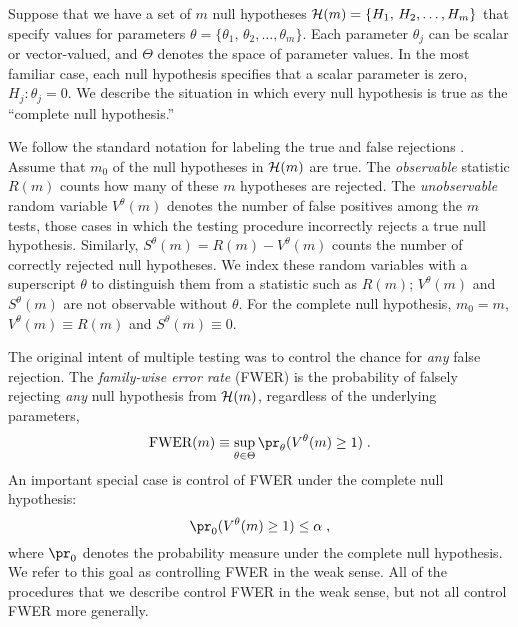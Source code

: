 \documentclass[12pt]{article}
\begin{document}
Suppose that we have a set of $m$ null hypotheses ${\cal H}(m) =
\{H_1, \, H_2, \ldots, H_m\}$ that specify values for parameters
$\theta = \{\theta_1,\,\theta_2, \ldots, \theta_m \}$.  Each parameter
$\theta_j$ can be scalar or vector-valued, and $\Theta$ denotes the
space of parameter values.  In the most familiar case, each null
hypothesis specifies that a scalar parameter is zero, $H_j: \theta_j =
0$.  We describe the situation in which every null hypothesis is true
as the ``complete null hypothesis.''

We follow the standard notation for labeling the true and false
rejections \citet{benjamini95}.  Assume that $m_0$ of the null
hypotheses in ${\cal H}(m)$ are true.  The {\em observable} statistic
$R(m)$ counts how many of these $m$ hypotheses are rejected.  The {\em
  unobservable} random variable $V^\theta(m)$ denotes the number of
false positives among the $m$ tests, those cases in which the testing
procedure incorrectly rejects a true null hypothesis.  Similarly,
$S^{\theta}(m) = R(m)-V^\theta(m)$ counts the number of correctly
rejected null hypotheses.  We index these random variables with a
superscript $\theta$ to distinguish them from a statistic such as
$R(m)$; $V^\theta(m)$ and $S^\theta(m)$ are not observable without
$\theta$.  For the complete null hypothesis, $m_0 = m$, $V^\theta(m)
\equiv R(m)$ and $S^{\theta}(m) \equiv 0$.

The original intent of multiple testing was to control the chance for {\em
any} false rejection.  The {\em family-wise error rate} (FWER) is the
probability of falsely rejecting {\em any} null hypothesis from ${\cal
H}(m)$, regardless of the underlying parameters,
\begin{equation}
  \mbox{FWER}(m) \equiv 
   \sup_{\theta \in \Theta} \pr_\theta(V^\theta(m) \ge 1) \;.
\label{eq:fwer}
\end{equation}
An important special case is control of FWER under the complete null
 hypothesis:
\begin{equation}
 \pr_0(V^\theta(m) \ge 1) \le \alpha \;,
\label{eq:size}
\end{equation}
where $\pr_0$ denotes the probability measure under the complete null
 hypothesis.  We refer to this goal as controlling FWER in the weak
 sense.  All of the procedures that we describe control FWER in the
 weak sense, but not all control FWER more generally.
\end{document}
